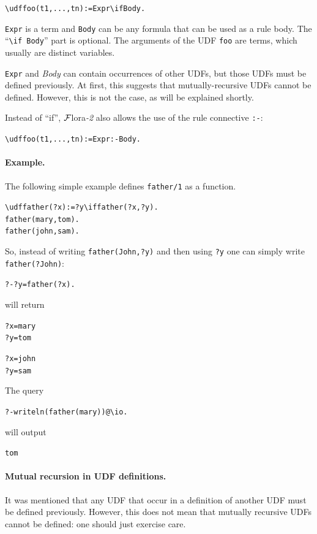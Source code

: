 \documentclass[11pt]{article}
\newcommand{\FLORA}{{\mbox{\sc ${\cal F}${lora}\rm\emph{-2}}}\xspace}
\newcommand{\FLSYSTEM}{\FLORA}
\newcommand{\bs}{\textbackslash}
\begin{document}
\begin{alltt}
    \bs{}udf foo(t1,...,tn) := Expr \bs{}if Body.
\end{alltt}

\noindent
\texttt{Expr} is a term and \texttt{Body} can be any formula that can be
used as a rule body.
The ``\texttt{\bs{}if Body}'' part is optional.
The arguments of the UDF \texttt{foo} are
terms, which usually are distinct variables.

\texttt{Expr} and \emph{Body} can contain occurrences of other UDFs, but those
UDFs must be defined previously. At first, this suggests that
mutually-recursive UDFs cannot be defined. However, this is not the case,
as will be explained shortly.

\medskip

\noindent
Instead of ``if'', \FLSYSTEM also allows the use of the rule connective
\texttt{:-}: 
\begin{alltt}
    \bs{}udf foo(t1,...,tn) := Expr :- Body.
\end{alltt}

\paragraph{Example.}
The following simple example defines \texttt{father/1} as a function.
\begin{alltt}
    \bs{}udf father(?x):=?y \bs{}if father(?x,?y).
    father(mary,tom).
    father(john,sam).
\end{alltt}

So, instead of writing \texttt{father(John,?y)}  and then using \texttt{?y}
one can simply write \texttt{father(?John)}:  
\begin{alltt}
    ?- ?y=father(?x).
\end{alltt}
will return
\begin{alltt}
    ?x=mary
    ?y=tom

    ?x=john
    ?y=sam
\end{alltt}
The query
\begin{alltt}
    ?- writeln(father(mary))@\bs{}io.
\end{alltt}
will output
\begin{alltt}
    tom
\end{alltt}

\paragraph{Mutual recursion in UDF definitions.}
It was mentioned that any UDF that occur in a definition of another UDF
must be defined previously. However, this does not mean that mutually
recursive UDFs cannot be defined: one should just exercise care.
\end{document}
